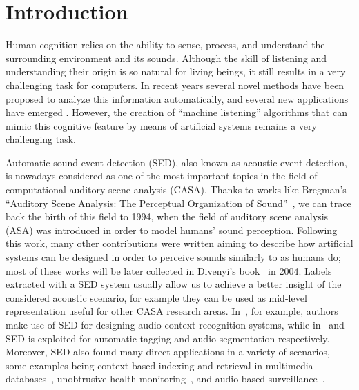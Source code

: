 \chapter{Introduction}\label{ch:intro}

Human cognition relies on the ability to sense, process, and understand the surrounding environment and its sounds.
Although the skill of listening and understanding their origin is so natural for living beings, it still results in a very challenging task for computers. In recent years several novel methods have been proposed to analyze this information automatically, and several new applications have emerged \cite{virtanen2018computational}. However, the creation of ``machine listening'' algorithms that can mimic this cognitive feature by means of artificial systems remains a very challenging task. 

Automatic sound event detection (SED), also known as acoustic event detection, is nowadays considered as one of the most important topics in the field of computational auditory scene analysis (CASA). Thanks to works like Bregman's ``Auditory Scene Analysis: The Perceptual Organization of Sound''~\cite{bregman1994auditory}, we can trace back the birth of this field to 1994, when the field of auditory scene analysis (ASA) was introduced in order to model humans' sound perception. Following this work, many other contributions were written aiming to describe how artificial systems can be designed in order to perceive sounds similarly to as humans do; most of these works will be later collected in Divenyi's book~\cite{divenyi2004speech} in 2004. Labels extracted with a SED system usually allow us to achieve a better insight of the considered acoustic scenario, for example they can be used as mid-level representation useful for other CASA research areas. In~\cite{chu2009environmental, heittola2010audio}, for example, authors make use of SED for designing audio context recognition systems, while in~\cite{shah2012lifelogging} and~\cite{wichern2010segmentation} SED is exploited for automatic tagging and audio segmentation respectively. Moreover, SED also found many direct applications in a variety of scenarios, some examples being context-based indexing and retrieval in multimedia databases~\cite{xu2008audio}, unobtrusive health monitoring~\cite{peng2009healthcare}, and audio-based surveillance~\cite{harma2005automatic, crocco2014surveillance, Principi2016a}.

